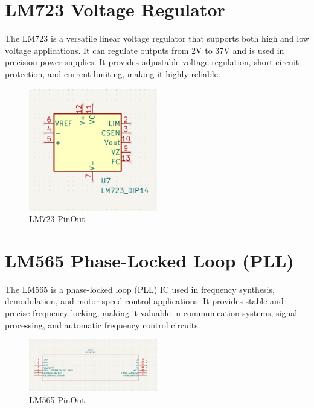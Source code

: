 \documentclass{article}
\begin{document}
\section{LM723 Voltage Regulator}
The LM723 is a versatile linear voltage regulator that supports both high and low voltage applications. It can regulate outputs from 2V to 37V and is used in precision power supplies. It provides adjustable voltage regulation, short-circuit protection, and current limiting, making it highly reliable.
\begin{figure}[H]
    \centering
    \includegraphics[width=0.5\textwidth]{img/LM723.png}
    \caption{LM723 PinOut}
    \label{fig:LM723}
\end{figure}

\section{LM565 Phase-Locked Loop (PLL)}
The LM565 is a phase-locked loop (PLL) IC used in frequency synthesis, demodulation, and motor speed control applications. It provides stable and precise frequency locking, making it valuable in communication systems, signal processing, and automatic frequency control circuits.
\begin{figure}[H]
    \centering
    \includegraphics[width=0.5\textwidth]{img/LM565.png}
    \caption{LM565 PinOut}
    \label{fig:LM565}
\end{figure}
\end{document}
